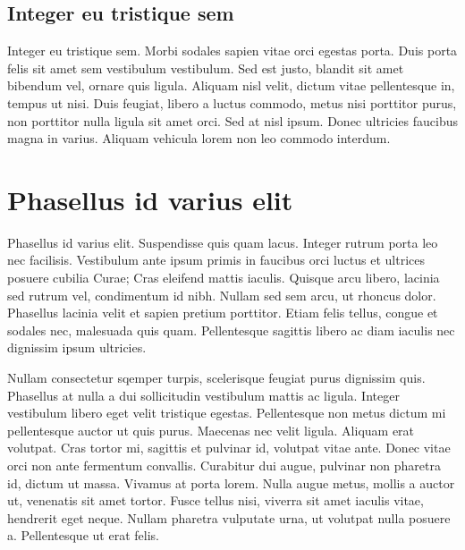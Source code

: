 \subsection{Integer eu tristique sem}

Integer eu tristique sem. Morbi sodales sapien vitae orci egestas porta. Duis
porta felis sit amet sem vestibulum vestibulum. Sed est justo, blandit sit amet
bibendum vel, ornare quis ligula. Aliquam nisl velit, dictum vitae pellentesque
in, tempus ut nisi. Duis feugiat, libero a luctus commodo, metus nisi porttitor
purus, non porttitor nulla ligula sit amet orci. Sed at nisl ipsum. Donec
ultricies faucibus magna in varius. Aliquam vehicula lorem non leo commodo
interdum.

\section{Phasellus id varius elit}

Phasellus id varius elit. Suspendisse quis quam lacus. Integer rutrum porta leo
nec facilisis. Vestibulum ante ipsum primis in faucibus orci luctus et ultrices
posuere cubilia Curae; Cras eleifend mattis iaculis. Quisque arcu libero,
lacinia sed rutrum vel, condimentum id nibh. Nullam sed sem arcu, ut rhoncus
dolor. Phasellus lacinia velit et sapien pretium porttitor. Etiam felis tellus,
congue et sodales nec, malesuada quis quam. Pellentesque sagittis libero ac diam
iaculis nec dignissim ipsum ultricies.

Nullam consectetur sqemper turpis, scelerisque feugiat purus dignissim quis.
Phasellus at nulla a dui sollicitudin vestibulum mattis ac ligula. Integer vestibulum libero eget velit tristique egestas. Pellentesque non metus dictum mi pellentesque auctor ut quis purus. Maecenas nec velit ligula. Aliquam erat volutpat. Cras tortor mi, sagittis et pulvinar id, volutpat vitae ante. Donec vitae orci non ante fermentum convallis. Curabitur dui augue, pulvinar non pharetra id, dictum ut massa. Vivamus at porta lorem. Nulla augue metus, mollis a auctor ut, venenatis sit amet tortor. Fusce tellus nisi, viverra sit amet iaculis vitae, hendrerit eget neque. Nullam pharetra vulputate urna, ut volutpat nulla posuere a. Pellentesque ut erat felis.

